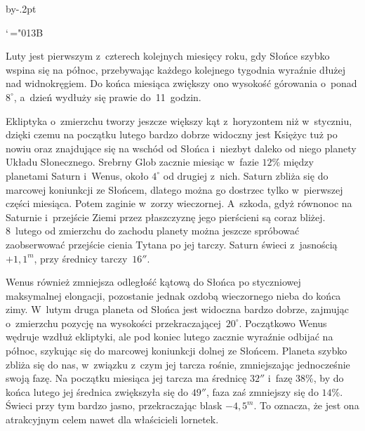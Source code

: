 

\advance\baselineskip by-.2pt



{\begin{dwieszpalty}
\mathcode`\,="013B


Luty jest pierwszym z~czterech kolejnych miesięcy roku, gdy Słońce szybko wspina się na północ, przebywając każdego kolejnego tygodnia wyraźnie dłużej nad widnokręgiem. Do końca miesiąca zwiększy ono wysokość górowania o~ponad $8^{\circ}$, a~dzień wydłuży się prawie do~11~godzin.

Ekliptyka o~zmierzchu tworzy jeszcze większy kąt z~horyzontem niż w~styczniu, dzięki czemu na początku lutego bardzo dobrze widoczny jest Księżyc tuż po nowiu oraz znajdujące się na wschód od Słońca i~niezbyt daleko od niego planety Układu Słonecznego. Srebrny Glob zacznie miesiąc w~fazie $12\%$ między planetami Saturn i~Wenus, około $4^{\circ}$ od drugiej z~nich. Saturn zbliża się do marcowej koniunkcji ze Słońcem, dlatego można go dostrzec tylko w~pierwszej części miesiąca. Potem zaginie w~zorzy wieczornej. A~szkoda, gdyż równonoc na Saturnie i~przejście Ziemi przez płaszczyznę jego pierścieni są coraz bliżej. 8~lutego od zmierzchu do zachodu planety można jeszcze spróbować zaobserwować przejście cienia Tytana po jej tarczy. Saturn świeci z~jasnością $+1,1^m$, przy średnicy tarczy~$16''$.

Wenus również zmniejsza odległość kątową do Słońca po styczniowej maksymalnej elongacji, pozostanie jednak ozdobą wieczornego nieba do końca zimy. W~lutym druga planeta od Słońca jest widoczna bardzo dobrze, zajmując o~zmierzchu pozycję na wysokości przekraczającej~$20^{\circ}$. Początkowo Wenus wędruje wzdłuż ekliptyki, ale pod koniec lutego zacznie wyraźnie odbijać na północ, szykując się do marcowej koniunkcji dolnej ze Słońcem. Planeta szybko zbliża się do nas, w~związku z~czym jej tarcza rośnie, zmniejszając jednocześnie swoją fazę. Na początku miesiąca jej tarcza ma średnicę $32''$ i~fazę $38\%$, by do końca lutego jej średnica zwiększyła się do $49''$, faza zaś zmniejszy się do $14\%$. Świeci przy tym bardzo jasno, przekraczając blask $-4,5^m$. To oznacza, że jest ona atrakcyjnym celem nawet dla właścicieli lornetek.



\end{dwieszpalty}}
